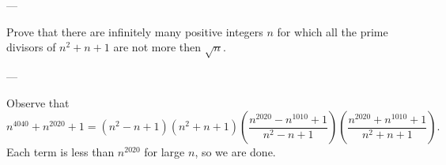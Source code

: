 
---

Prove that there are infinitely many positive integers $n$ for which all the prime divisors of $n^2+n+1$ are not more then $\sqrt n$.

---

Observe that
\[n^{4040}+n^{2020}+1=\left(n^2-n+1\right)\left(n^2+n+1\right)\left(\frac{n^{2020}-n^{1010}+1}{n^2-n+1}\right)\left(\frac{n^{2020}+n^{1010}+1}{n^2+n+1}\right).\]
Each term is less than $n^{2020}$ for large $n$, so we are done.
